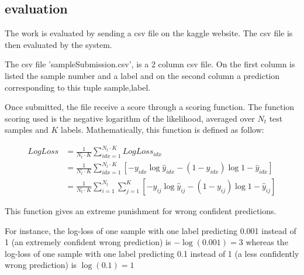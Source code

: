 	\subsection{evaluation}
		The work is evaluated by sending a csv file on the kaggle website. The csv file is then evaluated by the system.

		The csv file 'sampleSubmission.csv', is a 2 column csv file. On the first column is listed the sample number and a label and on the second column a prediction corresponding to this tuple {sample,label}.

		Once submitted, the file receive a score through a scoring function. The function scoring used is the negative logarithm of the likelihood, averaged over $N_t$ test samples and $K$ labels.
		Mathematically, this function is defined as follow:

		\begin{equation} \label{eq1}
			\begin{split}
				LogLoss & = \frac{1}{N_t \cdot K} \sum_{idx=1}^{N_t \cdot K} LogLoss_{idx} \\
				&= \frac{1}{N_t \cdot K} \sum_{idx=1}^{N_t \cdot K} [-y_{idx} \log{\hat{y}_{idx}} - (1-y_{idx}) \log{1-\hat{y}_{idx}}] \\
		        &= \frac{1}{N_t \cdot K} \sum_{i=1}^{N_t} \sum_{j=1}^{K} [-y_{ij} \log{\hat{y}_{ij}} - (1-y_{ij}) \log{1-\hat{y}_{ij}}]
			\end{split}
		\end{equation}

		This function gives an extreme punishment for wrong confident predictions. 

		For instance, the log-loss of one sample with one label predicting 0.001 instead of 1 (an extremely confident wrong prediction) is $-\log(0.001) = 3 $ whereas the log-loss of one sample with one label predicting 0.1 instead of 1 (a less confidently wrong prediction) is $\log(0.1) = 1$


